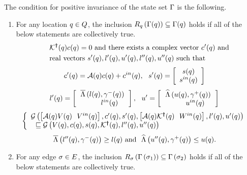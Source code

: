 \begin{lemma}
  The condition for positive invariance of the state set $\Gamma$
  is the following.
\begin{enumerate}
\item For any location $q\in Q$, the inclusion
  $R_{q}\left(\Gamma(q)\right)\subseteq
  \Gamma(q)$ holds if all of the below statements are
  collectively true.
\begin{align}~\label{eqn:locinv}
\begin{split}
& \mathcal{K}^{\bm{\dagger}}(q)c(q) = 0~\text{and there exists a complex vector}~
  c^\prime(q)~\text{and}\\
& \text{real
    vectors}~s^\prime(q),l^\prime(q),u^\prime(q),l^{\prime\prime}(q),u^{\prime\prime}(q)~\text{such
    that}\\
\end{split}
\end{align}
\vspace{-1.5em}
\begin{align}
& c^\prime(q) = \mathcal{A}(q)c(q)+c^{in}(q),~~s^\prime(q) =
  \left[\begin{array}{c}{s(q)}\\{s^{in}(q)} \end{array}\right]
\end{align}
\vspace{-1.5em}
\begin{align}
& l^\prime(q) =
  \left[\begin{array}{c}{\overline{\Lambda}\left(l(q),\gamma^-(q)\right)}\\{~~~~~~~~~l^{in}(q)~~~} \end{array}\right],~~u^\prime
  =
  \left[\begin{array}{c}{\widehat{\Lambda}\left(u(q),\gamma^+(q)\right)}\\{~~~~~~~~~u^{in}(q)~~~} \end{array}\right]
\end{align}
\vspace{-1.5em}
\begin{align}
& \left\{\begin{array}{l}{\mathcal{G}\left(\left[\mathcal{A}(q)V(q)~~V^{in}(q)\right],c^\prime(q),s^\prime(q),\left[\mathcal{A}(q)\mathcal{K}^{\bm{\dagger}}(q)~~W^{in}(q)\right],l^\prime(q),u^\prime(q)\right)}\\{~~\sqsubseteq
   \mathcal{G}\left(V(q),c(q),s(q),\mathcal{K}^{\bm{\dagger}}(q),l^{\prime\prime}(q),u^{\prime\prime}(q)\right)} \end{array}\right.
\end{align}
\vspace{-1.5em}
\begin{align}
& \overline{\Lambda}\left(l^{\prime\prime}(q),\gamma^-(q)\right)\geq l(q)~\text{and}~~
\widehat{\Lambda}\left(u^{\prime\prime}(q),\gamma^+(q)\right)\leq u(q).
 \end{align}
\item For any edge $\sigma\in E$, the inclusion
  $R_{\sigma}\left(\Gamma\left(\sigma_{1}\right)\right)
  \subseteq \Gamma\left(\sigma_{2}\right)$ holds if 
  all of the below statements are collectively true.
\begin{align}~\label{eqn:edgeinv}

\end{align}
\end{enumerate}
\end{lemma}
